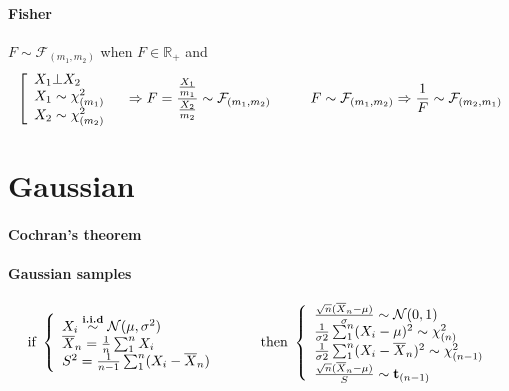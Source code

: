 \documentclass[a4paper,10pt]{article}
\begin{document}
\paragraph{Fisher} $F\sim \mathcal{F}_{(m_1,m_2)}$ when  $F \in \mathbb{R}_+$ and
\[
\left[
\begin{array}{l}
X_1 \bot X_2            \\
X_1 \sim \chi^2_{(m_1)} \\
X_2 \sim \chi^2_{(m_2)}
\end{array}\right.
\hspace{3mm} \Rightarrow
F=\frac{\frac{X_1}{m_1}}{\frac{X_2}{m_2}} \sim \mathcal{F}_{(m_1,m_2)}
\hspace{10mm}
F\sim \mathcal{F}_{(m_1,m_2)} \Rightarrow \frac{1}{F} \sim \mathcal{F}_{(m_2,m_1)} 
\]



\section{Gaussian}
\paragraph{Cochran's theorem}

\paragraph{Gaussian samples}
\[
\text{if }
\left\{
\begin{array}{l}
X_i \stackrel{\textbf{i.i.d}}{\sim} \mathcal{N}(\mu, \sigma^2) \\
\overline{X}_n = \frac{1}{n}\sum^n_1 X_i \\
S^2 = \frac{1}{n-1}\sum^n_1 (X_i - \overline{X}_n) 
\end{array}\right.
\hspace{10mm}
\text{then }
\left\{
\begin{array}{l}
\frac{\sqrt{n} (\overline{X}_n - \mu)}{\sigma} \sim \mathcal{N}(0,1) \\
\frac{1}{\sigma2}\sum^n_1 (X_i - \mu)^2 \sim \chi^2_{(n)} \\
\frac{1}{\sigma2}\sum^n_1 (X_i - \overline{X}_n)^2 \sim \chi^2_{(n-1)} \\
\frac{\sqrt{n} (\overline{X}_n - \mu)}{S} \sim \textbf{t}_{(n-1)}
\end{array}\right.
\]
\end{document}
